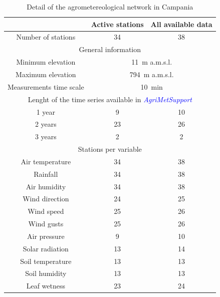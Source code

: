 \documentclass[authoryear,preprint,review,12pt]{elsarticle}
\newcommand{\update}[1]{\emph{\textcolor{blue}{#1}}}
\newcommand{\gci}{\update{AgriMetSupport}\xspace}
\begin{document}
\begin{table}[]
    \centering
    \begin{tabular}{c|c|c}
        & \textbf{Active stations} & \textbf{All available data} \\ 
        \hline
        Number of stations & 34 & 38 \\
        \hline
        \multicolumn{3}{c}{General information} \\
        \hline
        Minimum elevation & \multicolumn{2}{c}{\SI{11}{\metre} a.m.s.l.}\\
        Maximum elevation & \multicolumn{2}{c}{\SI{794}{\metre} a.m.s.l.} \\
        Measurements time scale & \multicolumn{2}{c}{\SI{10}{\minute}} \\
        \hline
        \multicolumn{3}{c}{Lenght of the time series available in \gci} \\
        \hline
        1 year & 9 & 10 \\
        2 years & 23 & 26 \\
        3 years & 2 & 2 \\
        \hline
        \multicolumn{3}{c}{Stations per variable} \\
        \hline
        Air temperature & 34 & 38 \\
        Rainfall & 34 & 38\\
        Air humidity & 34 & 38\\
        Wind direction & 24 & 25\\
        Wind speed & 25 & 26\\
        Wind gusts & 25 & 26\\
        Air pressure & 9 & 10\\
        Solar radiation & 13 & 14\\
        Soil temperature & 13 & 13\\
        Soil humidity & 13 & 13\\
        Leaf wetness & 23 & 24 
    \end{tabular}
    \caption{Detail of the agrometereological network in Campania}
    \label{tab:rarSummary}
\end{table}
\end{document}
